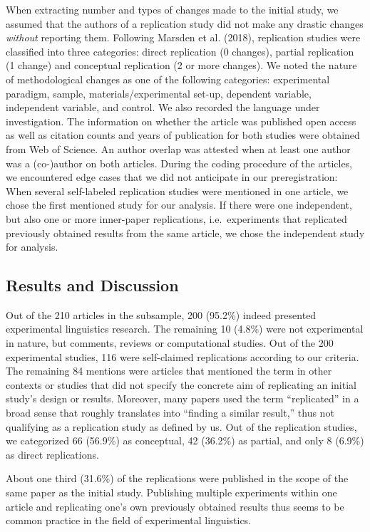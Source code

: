 \documentclass[]{elsarticle} %
\begin{document}
When extracting number and types of changes made to the initial study, we assumed that the authors of a replication study did not make any drastic changes \emph{without} reporting them.
Following Marsden et al. (2018), replication studies were classified into three categories: direct replication (0 changes), partial replication (1 change) and conceptual replication (2 or more changes).
We noted the nature of methodological changes as one of the following categories:
experimental paradigm, sample, materials/experimental set-up, dependent variable, independent variable, and control.
We also recorded the language under investigation.
The information on whether the article was published open access as well as citation counts and years of publication for both studies were obtained from Web of Science.
An author overlap was attested when at least one author was a (co-)author on both articles.
During the coding procedure of the articles, we encountered edge cases that we did not anticipate in our preregistration: When several self-labeled replication studies were mentioned in one article, we chose the first mentioned study for our analysis. If there were one independent, but also one or more inner-paper replications, i.e.~experiments that replicated previously obtained results from the same article, we chose the independent study for analysis.

\hypertarget{results-and-discussion-1}{%
\subsection{Results and Discussion}\label{results-and-discussion-1}}

Out of the 210 articles in the subsample, 200 (95.2\%) indeed presented experimental linguistics research. The remaining 10 (4.8\%) were not experimental in nature, but comments, reviews or computational studies. Out of the 200 experimental studies, 116 were self-claimed replications according to our criteria. The remaining 84 mentions were articles that mentioned the term in other contexts or studies that did not specify the concrete aim of replicating an initial study's design or results. Moreover, many papers used the term ``replicated'' in a broad sense that roughly translates into ``finding a similar result,'' thus not qualifying as a replication study as defined by us.
Out of the replication studies, we categorized 66 (56.9\%) as conceptual, 42 (36.2\%) as partial, and only 8 (6.9\%) as direct replications.

About one third (31.6\%) of the replications were published in the scope of the same paper as the initial study. Publishing multiple experiments within one article and replicating one's own previously obtained results thus seems to be common practice in the field of experimental linguistics.
\end{document}
